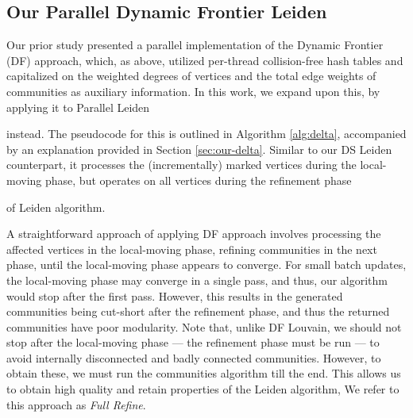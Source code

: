 


\subsection{Our Parallel Dynamic Frontier Leiden}

Our prior study \cite{sahu2024dflouvain} presented a parallel implementation of the Dynamic Frontier (DF) approach, which, as above, utilized per-thread collision-free hash tables and capitalized on the weighted degrees of vertices and the total edge weights of communities as auxiliary information. In this work, we expand upon this, by applying it to Parallel Leiden instead. The pseudocode for this is outlined in Algorithm \ref{alg:delta}, accompanied by an explanation provided in Section \ref{sec:our-delta}. Similar to our DS Leiden counterpart, it processes the (incrementally) marked vertices during the local-moving phase, but operates on all vertices during the refinement phase of Leiden algorithm.

A straightforward approach of applying DF approach involves processing the affected vertices in the local-moving phase, refining communities in the next phase, until the local-moving phase appears to converge. For small batch updates, the local-moving phase may converge in a single pass, and thus, our algorithm would stop after the first pass. However, this results in the generated communities being cut-short after the refinement phase, and thus the returned communities have poor modularity. Note that, unlike DF Louvain, we should not stop after the local-moving phase --- the refinement phase must be run --- to avoid internally disconnected and badly connected communities. However, to obtain these, we must run the communities algorithm till the end. This allows us to obtain high quality and retain properties of the Leiden algorithm, We refer to this approach as \textit{Full Refine}.

